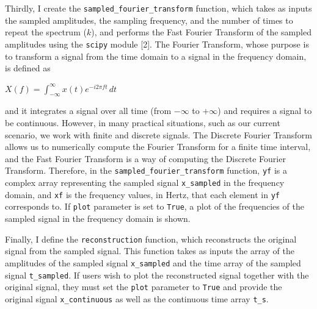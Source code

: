\documentclass{article}
\begin{document}
Thirdly, I create the \verb|sampled_fourier_transform| function, which takes as inputs the sampled amplitudes, the sampling frequency, and the number of times to repeat the spectrum ($k$), 
and performs the Fast Fourier Transform of the sampled amplitudes using the \verb|scipy| module [2].
The Fourier Transform, whose purpose is to transform a signal from the time domain to a signal in the frequency domain, is defined as
\begin{center}
    \begin{math}
       X(f) = \displaystyle \int_{-\infty}^{\infty} x(t)e^{-i2\pi ft}\, dt
    \end{math}
\end{center}
and it integrates a signal over all time (from $-\infty$ to $+\infty$) and requires a signal to be continuous. 
However, in many practical situations, such as our current scenario, we work with finite and discrete signals. 
The Discrete Fourier Transform allows us to numerically compute the Fourier Transform for a finite time interval, 
and the Fast Fourier Transform is a way of computing the Discrete Fourier Transform. 
Therefore, in the \verb|sampled_fourier_transform| function, \verb|yf| is a complex array representing the sampled signal \verb|x_sampled| in the frequency domain, 
and \verb|xf| is the frequency values, in Hertz, that each element in \verb|yf| corresponds to.
If \verb|plot| parameter is set to \verb|True|, a plot of the frequencies of the sampled signal in the frequency domain is shown.

Finally, I define the \verb|reconstruction| function, which reconstructs the original signal from the sampled signal.
This function takes as inputs the array of the amplitudes of the sampled signal \verb|x_sampled| and the time array of the sampled signal \verb|t_sampled|.
If users wish to plot the reconstructed signal together with the original signal, they must set the \verb|plot| parameter to \verb|True| and provide the original signal \verb|x_continuous| as well as the continuous time array \verb|t_s|.
\end{document}
